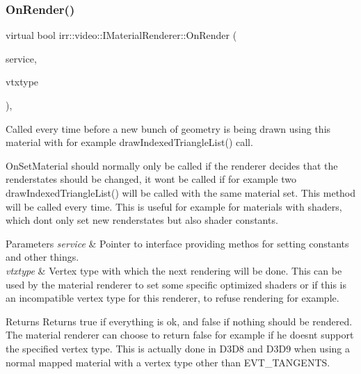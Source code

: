 \subsubsection{\texorpdfstring{On\+Render()}{OnRender()}\hspace{0.1cm}{\footnotesize\ttfamily [2/2]}}
{\footnotesize\ttfamily virtual bool irr\+::video\+::\+I\+Material\+Renderer\+::\+On\+Render (\begin{DoxyParamCaption}\item[{\hyperlink{classirr_1_1video_1_1IMaterialRendererServices}{I\+Material\+Renderer\+Services} $\ast$}]{service,  }\item[{\hyperlink{namespaceirr_1_1video_a0e3b59e025e0d0db0ed2ee0ce904deac}{E\+\_\+\+V\+E\+R\+T\+E\+X\+\_\+\+T\+Y\+PE}}]{vtxtype }\end{DoxyParamCaption})\hspace{0.3cm}{\ttfamily [inline]}, {\ttfamily [virtual]}}



Called every time before a new bunch of geometry is being drawn using this material with for example draw\+Indexed\+Triangle\+List() call. 

On\+Set\+Material should normally only be called if the renderer decides that the renderstates should be changed, it won\textquotesingle{}t be called if for example two draw\+Indexed\+Triangle\+List() will be called with the same material set. This method will be called every time. This is useful for example for materials with shaders, which don\textquotesingle{}t only set new renderstates but also shader constants. 
\begin{DoxyParams}{Parameters}
{\em service} & Pointer to interface providing methos for setting constants and other things. \\
\hline
{\em vtxtype} & Vertex type with which the next rendering will be done. This can be used by the material renderer to set some specific optimized shaders or if this is an incompatible vertex type for this renderer, to refuse rendering for example. \\
\hline
\end{DoxyParams}
\begin{DoxyReturn}{Returns}
Returns true if everything is ok, and false if nothing should be rendered. The material renderer can choose to return false for example if he doesn\textquotesingle{}t support the specified vertex type. This is actually done in D3\+D8 and D3\+D9 when using a normal mapped material with a vertex type other than E\+V\+T\+\_\+\+T\+A\+N\+G\+E\+N\+TS. 
\end{DoxyReturn}
\mbox{\label{classirr_1_1video_1_1IMaterialRenderer_aeaffc03c1b9feb40cd01469726b287e3}} 
